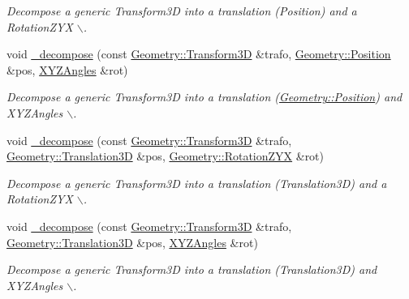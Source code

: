 \begin{DoxyCompactItemize}
\begin{DoxyCompactList}\small\item\em Decompose a generic Transform3D into a translation (Position) and a RotationZYX $\backslash$. \item\end{DoxyCompactList}\item 
void \hyperlink{group___d_d4_h_e_p___g_e_o_m_e_t_r_y_gad0cc5511671f40c3394c8688e7a2316f}{\_\-decompose} (const \hyperlink{namespace_d_d4hep_1_1_geometry_aeb4c0356d12fd7be49a0aae50514e64b}{Geometry::Transform3D} \&trafo, \hyperlink{namespace_d_d4hep_1_1_geometry_a55083902099d03506c6db01b80404900}{Geometry::Position} \&pos, \hyperlink{namespace_d_d4hep_1_1_geometry_ab195c63789d4928d291d3b5522151aaa}{XYZAngles} \&rot)
\begin{DoxyCompactList}\small\item\em Decompose a generic Transform3D into a translation (\hyperlink{namespace_d_d4hep_1_1_geometry_a55083902099d03506c6db01b80404900}{Geometry::Position}) and XYZAngles $\backslash$. \item\end{DoxyCompactList}\item 
void \hyperlink{group___d_d4_h_e_p___g_e_o_m_e_t_r_y_ga46814636f071d07ca4567f3244884664}{\_\-decompose} (const \hyperlink{namespace_d_d4hep_1_1_geometry_aeb4c0356d12fd7be49a0aae50514e64b}{Geometry::Transform3D} \&trafo, \hyperlink{namespace_d_d4hep_1_1_geometry_ab90afde486c9b46f4fa91bc659271b99}{Geometry::Translation3D} \&pos, \hyperlink{namespace_d_d4hep_1_1_geometry_a24667b2b9c3cec3d5239828db4d52189}{Geometry::RotationZYX} \&rot)
\begin{DoxyCompactList}\small\item\em Decompose a generic Transform3D into a translation (Translation3D) and a RotationZYX $\backslash$. \item\end{DoxyCompactList}\item 
void \hyperlink{group___d_d4_h_e_p___g_e_o_m_e_t_r_y_gafde0308d492794fe4b55f66247921482}{\_\-decompose} (const \hyperlink{namespace_d_d4hep_1_1_geometry_aeb4c0356d12fd7be49a0aae50514e64b}{Geometry::Transform3D} \&trafo, \hyperlink{namespace_d_d4hep_1_1_geometry_ab90afde486c9b46f4fa91bc659271b99}{Geometry::Translation3D} \&pos, \hyperlink{namespace_d_d4hep_1_1_geometry_ab195c63789d4928d291d3b5522151aaa}{XYZAngles} \&rot)
\begin{DoxyCompactList}\small\item\em Decompose a generic Transform3D into a translation (Translation3D) and XYZAngles $\backslash$. \item\end{DoxyCompactList}\item 

\end{DoxyCompactItemize}
